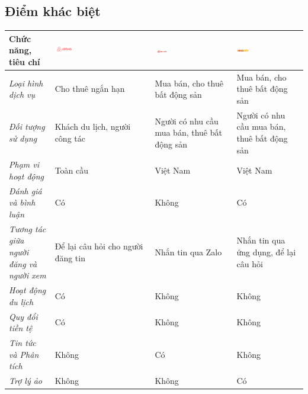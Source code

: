 \subsection{Điểm khác biệt}
\begin{center}
    \begin{tabular}{|m{4cm}|m{4cm}|m{4cm}|m{4cm}|}
    \hline
    \bf Chức năng, tiêu chí
    & 
    \includegraphics[width=0.2\textwidth]{Images/RelatedSystems/Airbnb.png}
    &
    \includegraphics[width=0.2\textwidth]{Images/RelatedSystems/Batdongsan.jpg}
    &
    \includegraphics[width=0.2\textwidth]{Images/RelatedSystems/NhaTot.png}
    \tabularnewline\hline
    \centering\textit{Loại hình dịch vụ} & Cho thuê ngắn hạn & Mua bán, cho thuê bất động sản & Mua bán, cho thuê bất động sản
    \tabularnewline\hline
    \centering\textit{Đối tượng sử dụng} & Khách du lịch, người công tác & Người có nhu cầu mua bán, thuê bất động sản & Người có nhu cầu mua bán, thuê bất động sản
    \tabularnewline\hline
    \centering\textit{Phạm vi hoạt động} & Toàn cầu & Việt Nam & Việt Nam
    \tabularnewline\hline
    \centering\textit{Đánh giá và bình luận} & Có & Không & Có
    \tabularnewline\hline
    \centering\textit{Tương tác giữa người đăng và người xem} & Để lại câu hỏi cho người đăng tin & Nhắn tin qua Zalo & Nhắn tin qua ứng dụng, để lại câu hỏi
    \tabularnewline\hline
    \centering\textit{Hoạt động du lịch} & Có & Không & Không
    \tabularnewline\hline
    \centering\textit{Quy đổi tiền tệ} & Có & Không & Không
    \tabularnewline\hline
    \centering\textit{Tin tức và Phân tích} & Không & Có & Không
    \tabularnewline\hline
    \centering\textit{Trợ lý ảo} & Không & Không & Có
    \tabularnewline\hline
    \end{tabular}
\end{center}